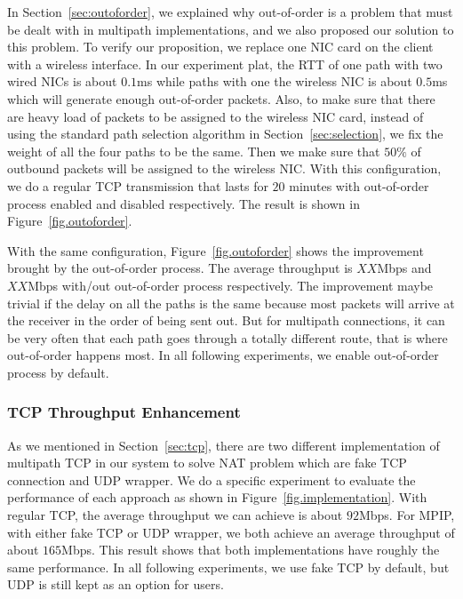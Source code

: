 In Section~\ref{sec:outoforder}, we explained why out-of-order is a problem that must be dealt with in multipath implementations, and we also proposed our solution to this problem. To verify our proposition, we replace one NIC card on the client with a wireless interface. In our experiment plat, the RTT of one path with two wired NICs is about $0.1$ms while paths with one the wireless NIC is about $0.5$ms which will generate enough out-of-order packets. Also, to make sure that there are heavy load of packets to be assigned to the wireless NIC card, instead of using the standard path selection algorithm in Section~\ref{sec:selection}, we fix the weight of all the four paths to be the same. Then we make sure that $50\%$ of outbound packets will be assigned to the wireless NIC.
With this configuration, we do a regular TCP transmission that lasts for $20$ minutes with out-of-order process enabled and disabled respectively. The result is shown in Figure~\ref{fig.outoforder}.

With the same configuration, Figure~\ref{fig.outoforder} shows the improvement brought by the out-of-order process. The average throughput is $XX$Mbps and $XX$Mbps with/out out-of-order process respectively. The improvement maybe trivial if the delay on all the paths is the same because most packets will arrive at the receiver in the order of being sent out. But for multipath connections, it can be very often that each path goes through a totally different route, that is where out-of-order happens most. In all following experiments, we enable out-of-order process by default.

\subsubsection{TCP Throughput Enhancement}
\label{sec:tcptp}

As we mentioned in Section~\ref{sec:tcp}, there are two different implementation of multipath TCP in our system to solve NAT problem which are fake TCP connection and UDP wrapper. We do a specific experiment to evaluate the performance of each approach as shown in Figure~\ref{fig.implementation}. With regular TCP, the average throughput we can achieve is about $92$Mbps. For MPIP, with either fake TCP or UDP wrapper, we both achieve an average throughput of about $165$Mbps. This result shows that both implementations have roughly the same performance. In all following experiments, we use fake TCP by default, but UDP is still kept as an option for users.


